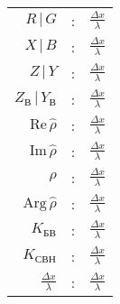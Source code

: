 \documentclass[12pt,a4paper]{article}
\begin{document}
	\begin{tabular}{ rlr }  
		$R\,|\,G$ & : & $\displaystyle\frac{\Delta x}{\lambda}$ \\ 
		$X\,|\,B$ & : & $\displaystyle\frac{\Delta x}{\lambda}$ \\
		$Z\,|\,Y$ & : & $\displaystyle\frac{\Delta x}{\lambda}$ \\
		$Z_{\text{В}}\,|\,Y_{\text{В}}$ &: & $\displaystyle\frac{\Delta x}{\lambda}$ \\
		$\mathrm{Re}\,\hat{\rho}$ & : & $\displaystyle\frac{\Delta x}{\lambda}$ \\
		$\mathrm{Im}\,\hat{\rho}$ & : & $\displaystyle\frac{\Delta x}{\lambda}$ \\
		$\rho$ & : & $\displaystyle\frac{\Delta x}{\lambda}$ \\
		$\mathrm{Arg}\,\hat{\rho}$ & : & $\displaystyle\frac{\Delta x}{\lambda}$ \\
		$K_{\text{БВ}}$ & : & $\displaystyle\frac{\Delta x}{\lambda}$ \\
		$K_{\text{СВН}}$ & : & $\displaystyle\frac{\Delta x}{\lambda}$ \\  
		$\displaystyle\frac{\Delta x}{\lambda}$ & : & $\displaystyle\frac{\Delta x}{\lambda}$ \\
	\end{tabular}
	\newpage
	\thispagestyle{empty}
\end{document}
